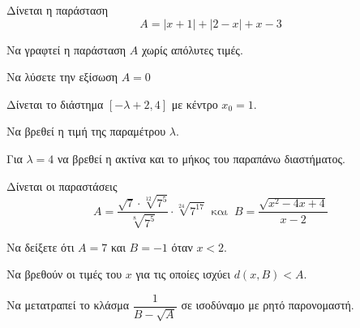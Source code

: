\documentclass[11pt,a4paper]{article}
\begin{document}
\begin{thema}
\item Δίνεται η παράσταση 
\[ A=|x+1|+|2-x|+x-3 \]
\begin{erwthma}
\item Να γραφτεί η παράσταση $ A $ χωρίς απόλυτες τιμές.
\item Να λύσετε την εξίσωση $ A=0 $
\item Δίνεται το διάστημα $ [-\lambda+2,4] $ με κέντρο $ x_0=1 $.
\begin{alist}
\item Να βρεθεί η τιμή της παραμέτρου $ \lambda $.
\item Για $ \lambda=4 $ να βρεθεί η ακτίνα και το μήκος του παραπάνω διαστήματος.
\end{alist}
\end{erwthma}
\item Δίνεται οι παραστάσεις 
\[ A=\frac{\sqrt{7}\cdot\sqrt[12]{7^5}}{\sqrt[8]{7^5}}\cdot\sqrt[24]{7^{17}}\ \text{ και }\ B=\frac{\sqrt{x^2-4x+4}}{x-2} \]
\begin{erwthma}
\item Να δείξετε ότι $ A=7 $ και $ B=-1 $ όταν $ x<2 $.
\item Να βρεθούν οι τιμές του $ x $ για τις οποίες ισχύει $ d(x,B)<A $.
\item Να μετατραπεί το κλάσμα $ \dfrac{1}{Β-\sqrt{Α}} $ σε ισοδύναμο με ρητό παρονομαστή.
\end{erwthma}
\end{thema}
\end{document}
